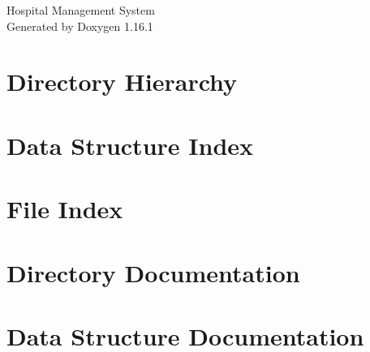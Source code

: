 \documentclass[twoside]{book}
\newcommand{\+}{\discretionary{\mbox{\scriptsize$\hookleftarrow$}}{}{}}
\newcommand{\clearemptydoublepage}{%
    \newpage{\pagestyle{empty}\cleardoublepage}%
  }
\begin{document}
  \raggedbottom
    \hypersetup{pageanchor=false,
                bookmarksnumbered=true,
                pdfencoding=unicode
               }
  \begin{titlepage}
  \vspace*{7cm}
  \begin{center}%
  {\Large Hospital Management System}\\
  \vspace*{1cm}
  {\large Generated by Doxygen 1.16.1}\\
  \end{center}
  \end{titlepage}
  \clearemptydoublepage
  \tableofcontents
  \clearemptydoublepage
  \hypersetup{pageanchor=true}


\chapter{Directory Hierarchy}

\chapter{Data Structure Index}

\chapter{File Index}

\chapter{Directory Documentation}





\chapter{Data Structure Documentation}












\end{document}

